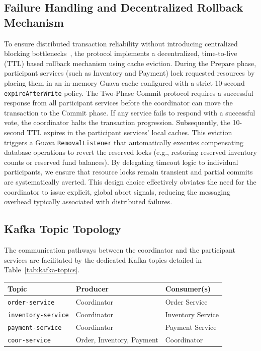 \subsection{Failure Handling and Decentralized Rollback Mechanism}
\label{subsec:failure-handling}

To ensure distributed transaction reliability without introducing centralized blocking bottlenecks~\cite{gray1992transaction}, the protocol implements a decentralized, time-to-live (TTL) based rollback mechanism using cache eviction.
%
During the Prepare phase, participant services (such as Inventory and Payment) lock requested resources by placing them in an in-memory Guava cache configured with a strict 10-second \texttt{expireAfterWrite} policy.
%
The Two-Phase Commit protocol requires a successful response from all participant services before the coordinator can move the transaction to the Commit phase.
%
If any service fails to respond with a successful vote, the coordinator halts the transaction progression.
%
Subsequently, the 10-second TTL expires in the participant services' local caches. This eviction triggers a Guava \texttt{RemovalListener} that automatically executes compensating database operations to revert the reserved locks (e.g., restoring reserved inventory counts or reserved fund balances).
%
By delegating timeout logic to individual participants, we ensure that resource locks remain transient and partial commits are systematically averted. This design choice effectively obviates the need for the coordinator to issue explicit, global abort signals, reducing the messaging overhead typically associated with distributed failures.
\newpage
\subsection{Kafka Topic Topology}
\label{subsec:kafka}

The communication pathways between the coordinator and the participant services are facilitated by the dedicated Kafka topics detailed in Table~\ref{tab:kafka-topics}.

\begin{center}
  \label{tab:kafka-topics}
  \begin{tabular}{lll}
    \toprule
    \textbf{Topic} & \textbf{Producer} & \textbf{Consumer(s)} \\
    \midrule
    \texttt{order-service}      & Coordinator & Order Service \\
    \texttt{inventory-service}  & Coordinator & Inventory Service \\
    \texttt{payment-service}    & Coordinator & Payment Service \\
    \texttt{coor-service}       & Order, Inventory, Payment & Coordinator \\
    \bottomrule
  \end{tabular}
\end{center}

